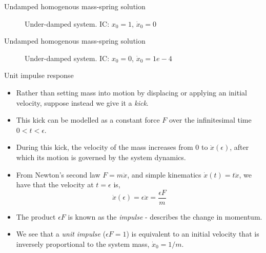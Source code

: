 \documentclass[11pt,aspectratio=169,handout]{beamer}
\begin{document}
\begin{frame}[c]{Undamped homogenous mass-spring solution}
	\begin{figure}
		
		\caption{Under-damped system. IC: $x_0 = 1$, $\dot{x}_0=0$}
	\end{figure}
\end{frame}

\begin{frame}[c]{Undamped homogenous mass-spring solution}
	\begin{figure}
		
		\caption{Under-damped system. IC: $x_0 = 0$, $\dot{x}_0=1e-4$}
	\end{figure}
\end{frame}

%		

\begin{frame}[c]{Unit impulse response}
	\begin{itemize}
		\item<1-> Rather than setting mass into motion by displacing or applying an initial velocity, suppose instead we give it a \textit{kick}.
		\item <2->This kick can be modelled as a constant force $F$ over the infinitesimal time $0<t<\epsilon$.
		\item<3-> During this kick, the velocity of the mass increases from 0 to $\dot{x}(\epsilon)$, after which its motion is governed by the system dynamics.
		\item<4-> From Newton's second law $F=m\ddot{x}$, and simple kinematics $\dot{x}(t) = t\ddot{x}$, we have that the velocity at $t=\epsilon$ is, 
		\begin{equation}
			\dot{x}(\epsilon) = \epsilon\ddot{x} = \frac{\epsilon F}{m}
		\end{equation}
		\item<5-> The product $\epsilon F$ is known as the \textit{impulse} - describes the change in momentum.
		\item<6-> We see that a \textit{unit impulse} ($\epsilon F = 1$) is equivalent to an initial velocity that is inversely proportional to the system mass, $\dot{x}_0 = 1/m$.
		
	\end{itemize}
\end{frame}
\end{document}

